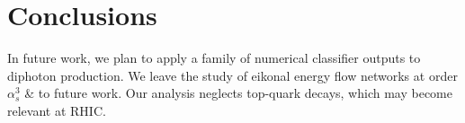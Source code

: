 \section{Conclusions}\label{sec:conclusions}

In future work, we plan to apply a family of numerical classifier
outputs to diphoton production. We leave the study of eikonal energy
flow networks at order $\alpha_s^3$ & to future work. Our analysis
neglects top-quark decays, which may become relevant at RHIC.

